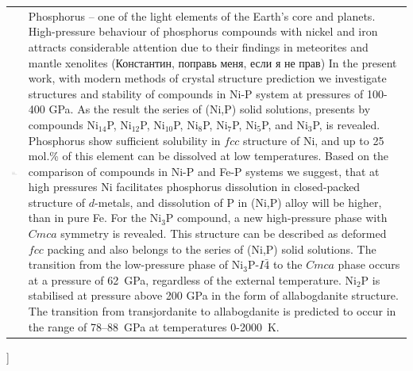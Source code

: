 \documentclass[twoside,twocolumn,9pt]{article}
\begin{document}
\begin{@twocolumnfalse}
\begin{tabular}{m{4.5cm} p{13.5cm} }
\includegraphics{head_foot/dates} & \noindent\normalsize{
%
Phosphorus – one of the light elements of the Earth's core and planets.
High-pressure behaviour of phosphorus compounds with nickel and iron attracts considerable attention due to their findings in meteorites and mantle xenolites {\color{red}(Константин, поправь меня, если я не прав)}
In the present work, with modern methods of crystal structure prediction we investigate structures and stability of compounds in Ni-P system at pressures of 100-400 GPa.
As the result the series of (Ni,P) solid solutions, presents by compounds Ni$_{14}$P, Ni$_{12}$P, Ni$_{10}$P, Ni$_8$P, Ni$_7$P, Ni$_5$P, and Ni$_3$P, is revealed.
Phosphorus show sufficient solubility in $fcc$ structure of Ni, and up to 25 mol.\% of this element can be dissolved at low temperatures.
Based on the comparison of compounds in Ni-P and Fe-P systems we suggest, that at high pressures Ni facilitates phosphorus dissolution in closed-packed structure of $d$-metals, and dissolution of P in (Ni,P) alloy will be higher, than in pure Fe.
For the Ni$_3$P compound, a new high-pressure phase with $Cmca$ symmetry is revealed. 
This structure can be described as deformed $fcc$ packing and also belongs to the series of (Ni,P) solid solutions.
The transition from the low-pressure phase of Ni$_3$P-$I\bar{4}$ to the $Cmca$ phase occurs at a pressure of 62~GPa, regardless of the external temperature. 
Ni$_2$P is stabilised at pressure above 200 GPa in the form of allabogdanite structure.
The transition from transjordanite to allabogdanite is predicted to occur in the range of 78--88~GPa at temperatures 0-2000~K. 


%
} \\%

\end{tabular}

 \end{@twocolumnfalse} \vspace{0.6cm}

]

\renewcommand*\rmdefault{bch}\normalfont\upshape
\rmfamily
\end{document}
